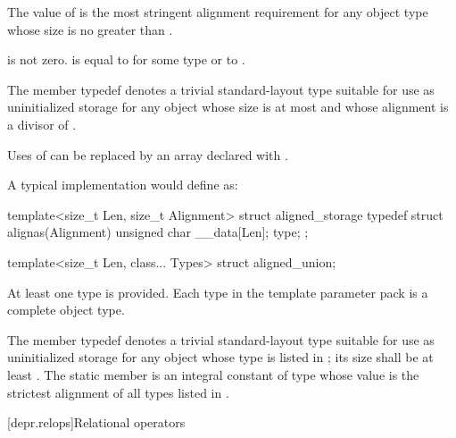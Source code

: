 \begin{itemdescr}
\pnum
The value of  is the most
stringent alignment requirement for any object type whose size
is no greater than .

\pnum
\mandates
{} is not zero.
 is equal to  for some type  or
to .

\pnum
The member typedef  denotes a trivial standard-layout type
suitable for use as uninitialized storage for any object
whose size is at most  and
whose alignment is a divisor of .

\pnum
\begin{note}
Uses of  can be replaced
by an array  declared with .
\end{note}

\pnum
\begin{note}
A typical implementation would define  as:
\begin{codeblock}
template<size_t Len, size_t Alignment>
struct aligned_storage {
  typedef struct {
    alignas(Alignment) unsigned char __data[Len];
  } type;
};
\end{codeblock}
\end{note}

\end{itemdescr}

%
\begin{itemdecl}
template<size_t Len, class... Types>
  struct aligned_union;
\end{itemdecl}

\begin{itemdescr}
\pnum
\mandates
At least one type is provided.
Each type in the template parameter pack 
is a complete object type.

\pnum
The member typedef  denotes a trivial standard-layout type
suitable for use as uninitialized storage for any object
whose type is listed in ;
its size shall be at least .
The static member 
is an integral constant of type 
whose value is the strictest alignment of all types listed in .
\end{itemdescr}

[depr.relops]{Relational operators}%
%

